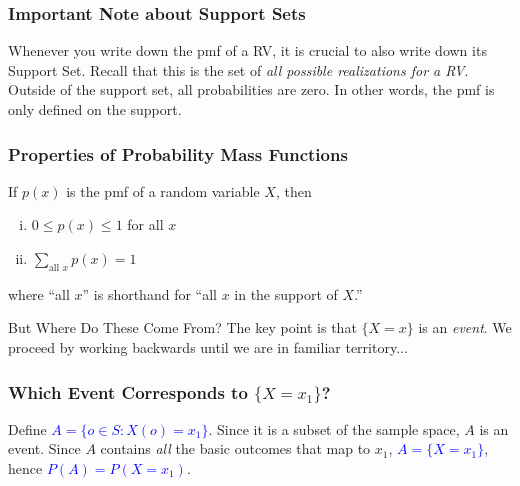 \documentclass[handout]{beamer}
\begin{document}
\begin{frame}
\frametitle{Important Note about Support Sets}
Whenever you write down the pmf of a RV, it is \alert{crucial} to also write down its Support Set. Recall that this is the set of \alert{\emph{all possible realizations for a RV}}. Outside of the support set, all probabilities are zero. In other words, the pmf is \alert{only defined} on the support.

\end{frame}
\begin{frame}
\frametitle{Properties of Probability Mass Functions}

If $p(x)$ is the pmf of a random variable $X$, then
\begin{enumerate}[(i)]
	\item $0\leq p(x) \leq 1$ for all $x$ \vspace{1em}
	\item $\displaystyle \sum_{\mbox{all } x} p(x) = 1$
\end{enumerate}

\vspace{0.75em}
where ``all $x$'' is shorthand for ``all $x$ in the support of $X$.''


 

\vspace{2em}
\begin{alertblock}{But Where Do These Come From?}
The key point is that $\{X=x\}$ is an \emph{event}. We proceed by working backwards until we are in familiar territory...
\end{alertblock}

\end{frame}
\begin{frame}
\frametitle{Which Event Corresponds to $\{X=x_1\}$?}

\begin{figure}
	\centering
{}
\end{figure}



Define \textcolor{blue}{$A = \{o \in S \colon X(o) = x_1\}$}. Since it is a subset of the sample space, $A$ is an event. Since $A$ contains \emph{all} the basic outcomes that map to $x_1$, \textcolor{blue}{$A = \{X=x_1\}$}, hence \textcolor{blue}{$P(A) = P(X=x_1)$}.


\end{frame}
\end{document}
